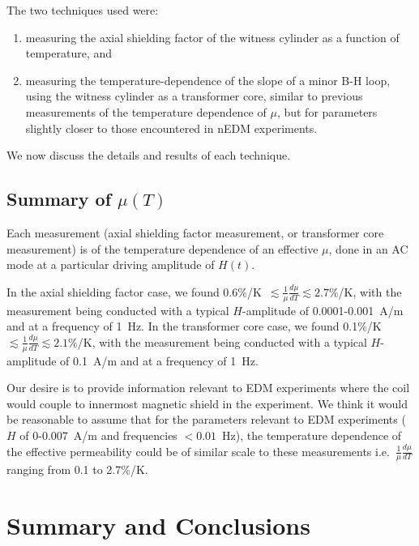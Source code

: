 \documentclass[review]{elsarticle}
\begin{document}
The two techniques used were:
\begin{enumerate}
\item measuring the axial shielding factor of the witness cylinder as
  a function of temperature, and
\item measuring the temperature-dependence of the slope of a minor B-H
  loop, using the witness cylinder as a transformer core, similar to
  previous measurements of the temperature dependence of $\mu$, but
  for parameters slightly closer to those encountered in nEDM
  experiments.
\end{enumerate}
We now discuss the details and results of each technique.







\subsection{Summary of $\mu(T)$}

Each measurement (axial shielding factor measurement, or transformer
core measurement) is of the temperature dependence of an effective
$\mu$, done in an AC mode at a particular driving amplitude of $H(t)$.

In the axial shielding factor case, we found
0.6\%/K~$\lesssim\frac{1}{\mu}\frac{d\mu}{dT}\lesssim 2.7\%$/K, with
the measurement being conducted with a typical $H$-amplitude of 0.0001-0.001~A/m
and at a frequency of 1~Hz.  In the transformer core case, we found
0.1\%/K~$\lesssim\frac{1}{\mu}\frac{d\mu}{dT}\lesssim 2.1\%$/K, with
the measurement being conducted with a typical $H$-amplitude of
0.1~A/m and at a frequency of 1~Hz.

Our desire is to provide information relevant to EDM experiments where
the coil would couple to innermost magnetic shield in the experiment.
We think it would be reasonable to assume that for the parameters
relevant to EDM experiments ($H$ of 0-0.007~A/m and frequencies
$<0.01$~Hz), the temperature dependence of the effective permeability
could be of similar scale to these measurements
i.e.~$\frac{1}{\mu}\frac{d\mu}{dT}$ ranging from 0.1 to 2.7\%/K.

\section{Summary and Conclusions}
\end{document}
